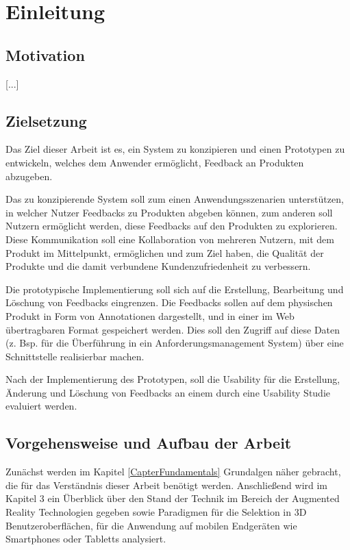 \chapter{Einleitung}

\section{Motivation}

[...]

\section{Zielsetzung}

Das Ziel dieser Arbeit ist es, ein System zu konzipieren und einen Prototypen zu entwickeln, welches dem Anwender ermöglicht, Feedback an Produkten
abzugeben. 

Das zu konzipierende System soll zum einen Anwendungsszenarien unterstützen, in welcher Nutzer Feedbacks zu Produkten abgeben können, 
zum anderen soll Nutzern ermöglicht werden, diese Feedbacks auf den Produkten zu explorieren. 
Diese Kommunikation soll eine Kollaboration von mehreren Nutzern, mit dem Produkt im Mittelpunkt, ermöglichen und zum Ziel haben, die Qualität der 
Produkte und die damit verbundene Kundenzufriedenheit zu verbessern.

Die prototypische Implementierung soll sich auf die Erstellung, Bearbeitung und Löschung von Feedbacks eingrenzen. Die Feedbacks sollen auf dem physischen 
Produkt in Form von Annotationen dargestellt, und in einer im Web übertragbaren Format gespeichert werden. Dies soll den Zugriff auf diese Daten 
(z. Bsp. für die Überführung in ein Anforderungsmanagement System) über eine Schnittstelle realisierbar machen.  

Nach der Implementierung des Prototypen, soll die Usability für die Erstellung, Änderung und Löschung von Feedbacks an einem durch 
eine Usability Studie evaluiert werden. 

\section{Vorgehensweise und Aufbau der Arbeit}

Zunächst werden im Kapitel \ref{CapterFundamentals} Grundalgen näher gebracht, die für das Verständnis dieser Arbeit benötigt werden. Anschließend wird 
im Kapitel 3 ein Überblick über den Stand der Technik im Bereich der Augmented Reality Technologien gegeben sowie Paradigmen für die Selektion in 3D Benutzeroberflächen, 
für die Anwendung auf mobilen Endgeräten wie Smartphones oder Tabletts analysiert.  
 
